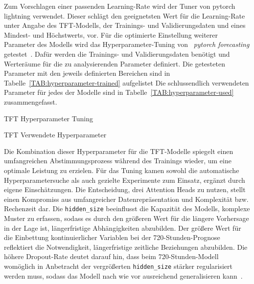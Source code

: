 \noindent Zum Vorschlagen einer passenden Learning-Rate wird der Tuner von pytorch lightning verwendet.
Dieser schlägt den geeignetsten Wert für die Learning-Rate unter Angabe des \ac{TFT}-Modells, der Trainings- und Validierungsdaten und eines Mindest- und Höchstwerts, vor.
Für die optimierte Einstellung weiterer Parameter des Modells wird das Hyperparameter-Tuning von ~\textit{pytorch forecasting} getestet~\cite{PytorchForecastingDocumentation.20230410T20:05:46.000Z}.
Dafür werden die Trainings- und Validierungsdaten benötigt und Werteräume für die zu analysierenden Parameter definiert.
Die getesteten Parameter mit den jeweils definierten Bereichen sind in Tabelle~\ref{TAB:hyperparameter-trained} aufgelistet
Die schlussendlich verwendeten Parameter für jedes der Modelle sind in Tabelle~\ref{TAB:hyperparameter-used} zusammengefasst.
\begin{table}[t]
 \small
 \caption{TFT Hyperparameter Tuning}
 \label{TAB:hyperparameter-trained}
 
\end{table}

\begin{table}[t]
 \small
 \caption{TFT Verwendete Hyperparameter}
 \label{TAB:hyperparameter-used}
 
\end{table}
\noindent Die Kombination dieser Hyperparameter für die \ac{TFT}-Modelle spiegelt einen umfangreichen Abstimmungsprozess während des Trainings wieder, um eine optimale Leistung zu erzielen.
Für das Tuning kamen sowohl die automatische Hyperparametersuche als auch gezielte Experimente zum Einsatz, ergänzt durch eigene Einschätzungen.
Die Entscheidung, drei Attention Heads zu nutzen, stellt einen Kompromiss aus umfangreicher Datenrepräsentation und Komplexität bzw. Rechenzeit dar.
Die \lstinline[columns=fixed]{hidden_size} beeinflusst die Kapazität des Modells, komplexe Muster zu erfassen, sodass es durch den größeren Wert für die längere Vorhersage in der Lage ist, längerfristige Abhängigkeiten abzubilden.
Der größere Wert für die Einbettung kontinuierlicher Variablen bei der 720-Stunden-Prognose reflektiert die Notwendigkeit, längerfristige zeitliche Beziehungen abzubilden.
Die höhere Dropout-Rate deutet darauf hin, dass beim 720-Stunden-Modell womöglich in Anbetracht der vergrößerten \lstinline[columns=fixed]{hidden_size} stärker regularisiert werden muss, sodass das Modell nach wie vor ausreichend generalisieren kann~\cite{Joseph.2022}.

